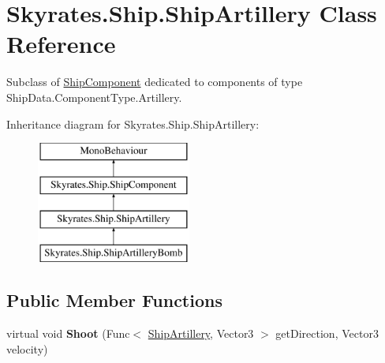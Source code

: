 \hypertarget{class_skyrates_1_1_ship_1_1_ship_artillery}{\section{Skyrates.\-Ship.\-Ship\-Artillery Class Reference}
\label{class_skyrates_1_1_ship_1_1_ship_artillery}
}


Subclass of \hyperlink{class_skyrates_1_1_ship_1_1_ship_component}{Ship\-Component} dedicated to components of type Ship\-Data.\-Component\-Type.\-Artillery.  


Inheritance diagram for Skyrates.\-Ship.\-Ship\-Artillery\-:\begin{figure}[H]
\begin{center}
\leavevmode
\includegraphics[height=4.000000cm]{class_skyrates_1_1_ship_1_1_ship_artillery}
\end{center}
\end{figure}
\subsection*{Public Member Functions}
\begin{DoxyCompactItemize}
\item 
\hypertarget{class_skyrates_1_1_ship_1_1_ship_artillery_a859e7a0232d9baacc4d37b2bd3594279}{virtual void {\bfseries Shoot} (Func$<$ \hyperlink{class_skyrates_1_1_ship_1_1_ship_artillery}{Ship\-Artillery}, Vector3 $>$ get\-Direction, Vector3 velocity)}\label{class_skyrates_1_1_ship_1_1_ship_artillery_a859e7a0232d9baacc4d37b2bd3594279}

\end{DoxyCompactItemize}
